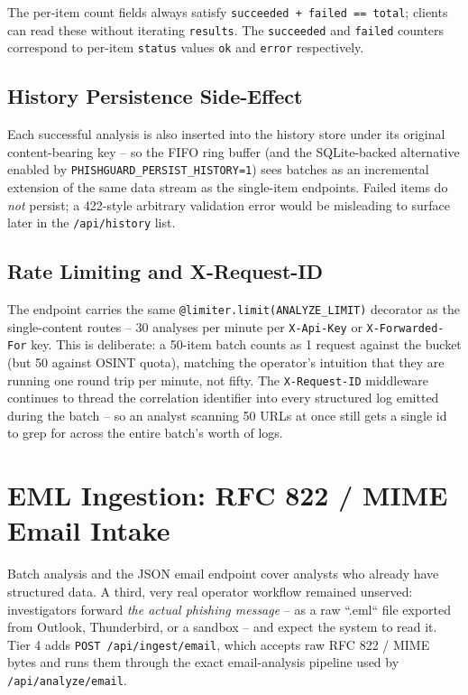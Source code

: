 The per-item count fields always satisfy \texttt{succeeded +
failed == total}; clients can read these without iterating
\texttt{results}.  The \texttt{succeeded} and \texttt{failed}
counters correspond to per-item \texttt{status} values \texttt{ok}
and \texttt{error} respectively.

\subsection{History Persistence Side-Effect}

Each successful analysis is also inserted into the history store
under its original content-bearing key -- so the FIFO ring buffer
(and the SQLite-backed alternative enabled by
\texttt{PHISHGUARD\_PERSIST\_HISTORY=1}) sees batches as an
incremental extension of the same data stream as the single-item
endpoints.  Failed items do \emph{not} persist; a 422-style
arbitrary validation error would be misleading to surface later in
the \texttt{/api/history} list.

\subsection{Rate Limiting and X-Request-ID}

The endpoint carries the same \texttt{@limiter.limit(ANALYZE\_LIMIT)} decorator as the
single-content routes -- 30 analyses per minute per
\texttt{X-Api-Key} or \texttt{X-Forwarded-For} key.  This is
deliberate: a 50-item batch counts as 1 request against the bucket
(but 50 against OSINT quota), matching the operator's intuition that
they are running one round trip per minute, not fifty.  The
\texttt{X-Request-ID} middleware continues to thread the
correlation identifier into every structured log emitted during the
batch -- so an analyst scanning 50 URLs at once still gets a
single id to grep for across the entire batch's worth of logs.

\section{EML Ingestion: RFC 822 / MIME Email Intake}\label{eml-ingestion}

Batch analysis and the JSON email endpoint cover analysts who already
have structured data.  A third, very real operator workflow remained
unserved: investigators forward \emph{the actual phishing message} --
as a raw ``.eml`` file exported from Outlook, Thunderbird, or a
sandbox -- and expect the system to read it.  Tier 4 adds
\texttt{POST \hspace{0pt}/api/ingest/email}, which accepts raw RFC 822
/ MIME bytes and runs them through the exact email-analysis pipeline
used by \texttt{/api/analyze/email}.

